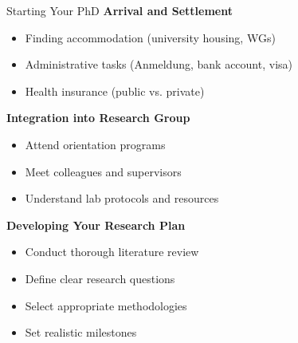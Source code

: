 \documentclass[aspectratio=169,10pt]{beamer}
\begin{document}
\begin{frame}{Starting Your PhD}
    \textbf{Arrival and Settlement}
    \begin{itemize}
        \item Finding accommodation (university housing, WGs)
        \item Administrative tasks (Anmeldung, bank account, visa)
        \item Health insurance (public vs. private)
    \end{itemize}
    
    \textbf{Integration into Research Group}
    \begin{itemize}
        \item Attend orientation programs
        \item Meet colleagues and supervisors
        \item Understand lab protocols and resources
    \end{itemize}
    
    \textbf{Developing Your Research Plan}
    \begin{itemize}
        \item Conduct thorough literature review
        \item Define clear research questions
        \item Select appropriate methodologies
        \item Set realistic milestones
    \end{itemize}
\end{frame}
\end{document}
